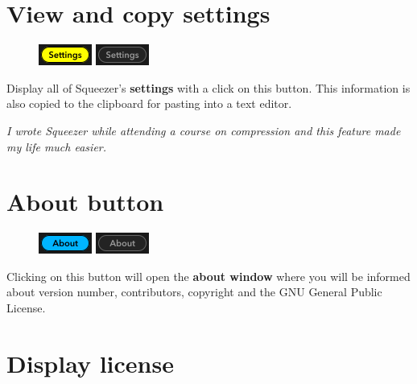 \newpage %

\section{View and copy settings}

\begin{figure}
  \includegraphics[scale=\screenshotscale,clip]{include/images/button_settings_on.png}
  \newline \vspace{-0.9\baselineskip}
  \includegraphics[scale=\screenshotscale,clip]{include/images/button_settings_off.png}
\end{figure}

Display all of Squeezer's \textbf{settings} with a click on this
button.  This information is also copied to the clipboard for pasting
into a text editor.

\emph{I wrote Squeezer while attending a course on compression and
  this feature made my life much easier.}

\section{About button}

\begin{figure}
  \includegraphics[scale=\screenshotscale,clip]{include/images/button_about_on.png}
  \newline \vspace{-0.9\baselineskip}
  \includegraphics[scale=\screenshotscale,clip]{include/images/button_about_off.png}
\end{figure}

Clicking on this button will open the \textbf{about window} where you
will be informed about version number, contributors, copyright and the
GNU General Public License.

\section{Display license}

